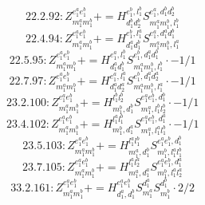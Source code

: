 \documentclass[letterpaper,10pt,fleqn,leqno,onecolumn]{article}
\begin{document}
\begin{equation} \;\;\;\;\;\;  22.2.92: Z^{e_{1}^{a}e_{1}^{b}}_{m_{1}^{a}m_{1}^{b}}+=H^{e_{1}^{b},l_{1}^{b}}_{d_{1}^{b}d_{2}^{b}}S^{e_{1}^{a},d_{1}^{b}d_{2}^{b}}_{m_{1}^{a}m_{1}^{b},l_{1}^{b}} \end{equation}
\begin{equation} \;\;\;\;\;\;  22.4.94: Z^{e_{1}^{a}e_{1}^{b}}_{m_{1}^{a}m_{1}^{b}}+=H^{e_{1}^{b},l_{1}^{a}}_{d_{1}^{a}d_{1}^{b}}S^{e_{1}^{a},d_{1}^{a}d_{1}^{b}}_{m_{1}^{a}m_{1}^{b},l_{1}^{a}} \end{equation}
\begin{equation} \;\;\;\;\;\;  22.5.95: Z^{e_{1}^{a}e_{1}^{b}}_{m_{1}^{a}m_{1}^{b}}+=H^{e_{1}^{a},l_{1}^{b}}_{d_{1}^{a}d_{1}^{b}}S^{e_{1}^{b},d_{1}^{a}d_{1}^{b}}_{m_{1}^{a}m_{1}^{b},l_{1}^{b}}\cdot -1/1 \end{equation}
\begin{equation} \;\;\;\;\;\;  22.7.97: Z^{e_{1}^{a}e_{1}^{b}}_{m_{1}^{a}m_{1}^{b}}+=H^{e_{1}^{a},l_{1}^{a}}_{d_{1}^{a}d_{2}^{a}}S^{e_{1}^{b},d_{1}^{a}d_{2}^{a}}_{m_{1}^{a}m_{1}^{b},l_{1}^{a}}\cdot -1/1 \end{equation}
\begin{equation} \;\;\;\;\;\;  23.2.100: Z^{e_{1}^{a}e_{1}^{b}}_{m_{1}^{a}m_{1}^{b}}+=H^{l_{1}^{b}l_{2}^{b}}_{m_{1}^{b},d_{1}^{b}}S^{e_{1}^{a}e_{1}^{b},d_{1}^{b}}_{m_{1}^{a},l_{1}^{b}l_{2}^{b}}\cdot -1/1 \end{equation}
\begin{equation} \;\;\;\;\;\;  23.4.102: Z^{e_{1}^{a}e_{1}^{b}}_{m_{1}^{a}m_{1}^{b}}+=H^{l_{1}^{a}l_{1}^{b}}_{m_{1}^{b},d_{1}^{a}}S^{e_{1}^{a}e_{1}^{b},d_{1}^{a}}_{m_{1}^{a},l_{1}^{a}l_{1}^{b}}\cdot -1/1 \end{equation}
\begin{equation} \;\;\;\;\;\;  23.5.103: Z^{e_{1}^{a}e_{1}^{b}}_{m_{1}^{a}m_{1}^{b}}+=H^{l_{1}^{a}l_{1}^{b}}_{m_{1}^{a},d_{1}^{b}}S^{e_{1}^{a}e_{1}^{b},d_{1}^{b}}_{m_{1}^{b},l_{1}^{a}l_{1}^{b}} \end{equation}
\begin{equation} \;\;\;\;\;\;  23.7.105: Z^{e_{1}^{a}e_{1}^{b}}_{m_{1}^{a}m_{1}^{b}}+=H^{l_{1}^{a}l_{2}^{a}}_{m_{1}^{a},d_{1}^{a}}S^{e_{1}^{a}e_{1}^{b},d_{1}^{a}}_{m_{1}^{b},l_{1}^{a}l_{2}^{a}} \end{equation}
\begin{equation} \;\;\;\;\;\;  33.2.161: Z^{e_{1}^{a}e_{1}^{b}}_{m_{1}^{a}m_{1}^{b}}+=H^{e_{1}^{a}e_{1}^{b}}_{d_{1}^{a},d_{1}^{b}}S^{d_{1}^{a}}_{m_{1}^{a}}S^{d_{1}^{b}}_{m_{1}^{b}}\cdot 2/2 \end{equation}
\end{document}
